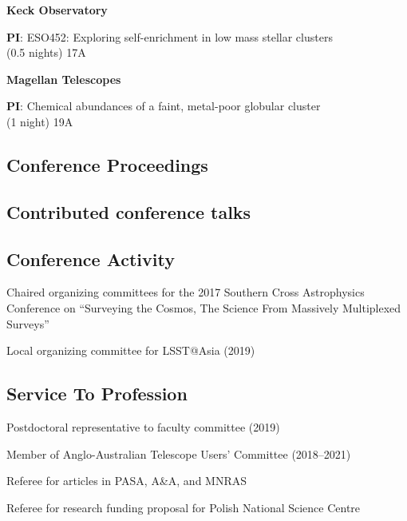 \documentclass[10pt]{article}
\newcommand{\cvlist}{}
\begin{document}
\vspace{0.1in}
\textbf{Keck Observatory}
\begin{innerlist}
\item \textbf{PI}: ESO452: Exploring self-enrichment in low mass stellar clusters\\ (0.5 nights)  \hfill{17A}
\end{innerlist}
\vspace{0.1in}
\textbf{Magellan Telescopes}
\begin{innerlist}
\item \textbf{PI}: Chemical abundances of a faint, metal-poor globular cluster\\ (1 night)  \hfill{19A}
\end{innerlist}

\subsection*{Conference Proceedings}
\begin{list}{}{\cvlist}

\end{list}

\subsection*{Contributed conference talks}
\begin{list}{}{\cvlist}

\end{list}

\subsection*{Conference Activity}
\begin{innerlist}
	\item Chaired organizing committees for the 2017 Southern Cross Astrophysics Conference on ``Surveying the Cosmos, The Science From Massively Multiplexed Surveys''
	\item Local organizing committee for LSST@Asia (2019)
\end{innerlist}


\subsection*{Service To Profession}
\begin{innerlist}
\item Postdoctoral representative to faculty committee (2019)
\item Member of Anglo-Australian Telescope Users' Committee (2018--2021)
\item Referee for articles in PASA, A\&A, and MNRAS
\item Referee for research funding proposal for Polish National Science Centre
\end{innerlist}
\end{document}

